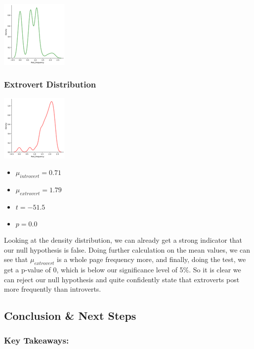 \documentclass[
]{article}
\providecommand{\tightlist}{%
  \setlength{\itemsep}{0pt}\setlength{\parskip}{0pt}}
\begin{document}
\includegraphics{7_1.png}

\hypertarget{extrovert-distribution}{%
\subsubsection{Extrovert Distribution}\label{extrovert-distribution}}

\includegraphics{7_2.png}

\begin{itemize}
\tightlist
\item
  \(\mu_{introvert} = 0.71\)
\item
  \(\mu_{extrovert} = 1.79\)
\item
  \(t = -51.5\)
\item
  \(p = 0.0\)
\end{itemize}

Looking at the density distribution, we can already get a strong
indicator that our null hypothesis is false. Doing further calculation
on the mean values, we can see that \(\mu_{extrovert}\) is a whole page
frequency more, and finally, doing the test, we get a p-value of 0,
which is below our significance level of 5\%. So it is clear we can
reject our null hypothesis and quite confidently state that extroverts
post more frequently than introverts.

\hypertarget{conclusion-next-steps}{%
\subsection{Conclusion \& Next Steps}\label{conclusion-next-steps}}

\hypertarget{key-takeaways}{%
\subsubsection{Key Takeaways:}\label{key-takeaways}}
\end{document}
